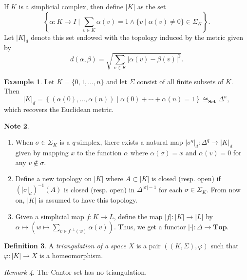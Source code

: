 \documentclass[10pt,letterpaper,cm]{nupset}
\theoremstyle{definition}
\newtheorem{definition}{Definition}[subsection]
\newtheorem{exmp}[definition]{Example}
\newtheorem{note}[definition]{Note}
\theoremstyle{theorem}
\theoremstyle{remark}
\newtheorem{remark}[definition]{Remark}
\newcommand{\1}{\mathbb{1}}
\newcommand{\0}{\vec 0}
\begin{document}
\smallskip

If $K$ is a simplicial complex, then define $\left\lvert{K}\right\rvert$ as the set $$\left\{\alpha : K \to I \mid \sum_{v\in K} \alpha(v)=1 \land \{v \mid \alpha(v) \ne 0\} \in \Sigma_K\right\}.$$ Let $\left\lvert{K}\right\rvert_d$ denote this set endowed with the topology induced by the metric given by $$d(\alpha, \beta) = \sqrt{\sum_{v\in K} \left\lvert{\alpha(v) -\beta(v)}\right\rvert^2} .$$


\begin{exmp}
Let  $K= \{0, 1, \ldots, n\}$ and let $\Sigma$ consist of all finite subsets of $K$. Then $$\left\lvert{K}\right\rvert_d = \left\{ (\alpha(0), \ldots, \alpha(n)) \mid \alpha(0) + \cdots + \alpha(n) = 1\right\} \cong_{\mathbf{Set}} \Delta^n,$$ which recovers the Euclidean metric. 
\end{exmp}

\begin{note} $ $
\begin{enumerate}
\item When $\sigma \in \Sigma_K$ is a $q$-simplex, there exists a natural map $\left\lvert{\sigma^q}\right\rvert_d : \Delta^q \to \left\lvert{K}\right\rvert_d$  given by mapping $x$ to the function $\alpha$ where $\alpha(\sigma) =x$ and $\alpha(v) = 0$ for any $v\notin \sigma$.  
\item Define a new topology on $\left\lvert{K}\right\rvert$ where $A\subset \left\lvert{K}\right\rvert$ is closed (resp. open) if $(\left\lvert{\sigma}\right\rvert_d)^{-1}(A)$ is closed (resp. open) in $\Delta^{\left\lvert{\sigma}\right\rvert -1}$ for each $\sigma \in \Sigma_K$. From now on, $\left\lvert{K}\right\rvert$ is assumed to have this topology. 
\item Given a simplicial map $f: K \to L$, define the map $\left\lvert{f}\right\rvert : \left\lvert{K}\right\rvert \to \left\lvert{L}\right\rvert$ by $\alpha \mapsto \left(w \mapsto \sum_{v\in f^{-1}(w)} \alpha(v)\right)$. Thus, we get a functor $\left\lvert{\cdot}\right\rvert : \Delta \to \mathbf{Top}$.
\end{enumerate}
\end{note}

\begin{definition}
A \textit{triangulation of a space $X$} is a pair $((K, \Sigma), \varphi)$ such that $\varphi : \left\lvert{K}\right\rvert \to X$ is a homeomorphism. 
\end{definition}

\begin{remark}
The Cantor set has no triangulation. 
\end{remark}
\end{document}
